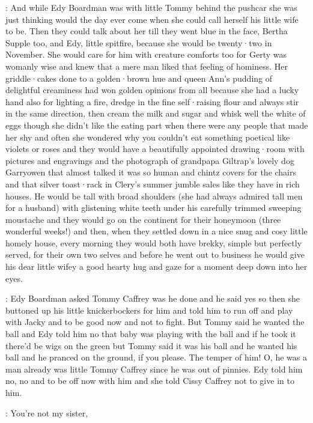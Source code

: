 :
And while Edy Boardman was with little Tommy behind the pushcar she was
just thinking would the day ever come when she could call herself his
little wife to be.
Then they could talk about her till they went blue in
the face,
Bertha Supple too,
and Edy,
little spitfire,
because she would
be twenty·two in November.
She would care for him with creature comforts
too for Gerty was womanly wise and knew that a mere man liked that
feeling of hominess.
Her griddle·cakes done to a golden·brown hue and
queen Ann's pudding of delightful creaminess had won golden opinions from
all because she had a lucky hand also for lighting a fire,
dredge in the
fine self·raising flour and always stir in the same direction,
then cream
the milk and sugar and whisk well the white of eggs though she didn't like
the eating part when there were any people that made her shy
and often she wondered why
you couldn't eat something poetical like violets or roses
and they would have a beautifully appointed drawing·room
with pictures and engravings
and the photograph of grandpapa Giltrap's lovely dog Garryowen
that almost talked
it was so human
and chintz covers for the chairs
and that silver toast·rack in Clery's summer jumble sales
like they have in rich houses.
He would be tall with broad shoulders (she had always
admired tall men for a husband) with glistening white teeth under his
carefully trimmed sweeping moustache and they would go on the continent
for their honeymoon (three wonderful weeks!) and then,
when they settled
down in a nice snug and cosy little homely house,
every morning they
would both have brekky,
simple but perfectly served,
for their own two
selves and before he went out to business he would give his dear little
wifey a good hearty hug and gaze for a moment deep down into her eyes.

:
Edy Boardman asked Tommy Caffrey was he done and he said yes so
then she buttoned up his little knickerbockers for him and told him to run
off and play with Jacky and to be good now and not to fight.
But Tommy
said he wanted the ball and Edy told him no that baby was playing with the
ball and if he took it there'd be wigs on the green but Tommy said it was
his ball and he wanted his ball and he pranced on the ground,
if you
please.
The temper of him!
O,
he was a man already was little Tommy
Caffrey since he was out of pinnies.
Edy told him no,
no and to be off now
with him and she told Cissy Caffrey not to give in to him.

\tommy:
You're not my sister,

